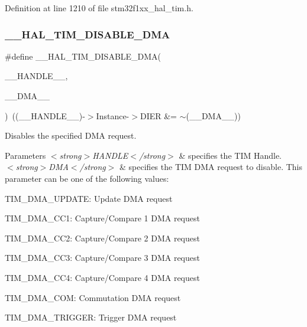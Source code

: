 Definition at line 1210 of file stm32f1xx\+\_\+hal\+\_\+tim.\+h.

\mbox{\label{group___t_i_m___exported___macros_ga1a6e8b19efd23fd0295802d904c4702f}} 
\subsubsection{\texorpdfstring{\+\_\+\+\_\+\+H\+A\+L\+\_\+\+T\+I\+M\+\_\+\+D\+I\+S\+A\+B\+L\+E\+\_\+\+D\+MA}{\_\_HAL\_TIM\_DISABLE\_DMA}}
{\footnotesize\ttfamily \#define \+\_\+\+\_\+\+H\+A\+L\+\_\+\+T\+I\+M\+\_\+\+D\+I\+S\+A\+B\+L\+E\+\_\+\+D\+MA(\begin{DoxyParamCaption}\item[{}]{\+\_\+\+\_\+\+H\+A\+N\+D\+L\+E\+\_\+\+\_\+,  }\item[{}]{\+\_\+\+\_\+\+D\+M\+A\+\_\+\+\_\+ }\end{DoxyParamCaption})~((\+\_\+\+\_\+\+H\+A\+N\+D\+L\+E\+\_\+\+\_\+)-\/$>$Instance-\/$>$D\+I\+ER \&= $\sim$(\+\_\+\+\_\+\+D\+M\+A\+\_\+\+\_\+))}



Disables the specified D\+MA request. 


\begin{DoxyParams}{Parameters}
{\em $<$strong$>$\+H\+A\+N\+D\+L\+E$<$/strong$>$} & specifies the T\+IM Handle. \\
\hline
{\em $<$strong$>$\+D\+M\+A$<$/strong$>$} & specifies the T\+IM D\+MA request to disable. This parameter can be one of the following values\+: \begin{DoxyItemize}
\item T\+I\+M\+\_\+\+D\+M\+A\+\_\+\+U\+P\+D\+A\+TE\+: Update D\+MA request \item T\+I\+M\+\_\+\+D\+M\+A\+\_\+\+C\+C1\+: Capture/\+Compare 1 D\+MA request \item T\+I\+M\+\_\+\+D\+M\+A\+\_\+\+C\+C2\+: Capture/\+Compare 2 D\+MA request \item T\+I\+M\+\_\+\+D\+M\+A\+\_\+\+C\+C3\+: Capture/\+Compare 3 D\+MA request \item T\+I\+M\+\_\+\+D\+M\+A\+\_\+\+C\+C4\+: Capture/\+Compare 4 D\+MA request \item T\+I\+M\+\_\+\+D\+M\+A\+\_\+\+C\+OM\+: Commutation D\+MA request \item T\+I\+M\+\_\+\+D\+M\+A\+\_\+\+T\+R\+I\+G\+G\+ER\+: Trigger D\+MA request \end{DoxyItemize}
\\
\hline
\end{DoxyParams}

